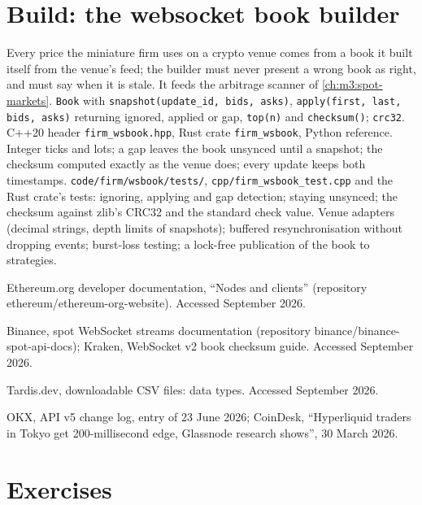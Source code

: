 \section{Build: the websocket book builder}\label{bld:m3:crypto-data-and-infrastructure:wsbook}

\begin{build}
 Every price the miniature firm uses on a crypto venue comes from a book it built itself from the venue's feed; the builder must never present a
wrong book as right, and must say when it is stale. It feeds the arbitrage scanner of \cref{ch:m3:spot-markets}.
 \texttt{Book} with \texttt{snapshot(update\_id, bids, asks)}, \texttt{apply(first, last, bids, asks)} returning ignored, applied or gap,
\texttt{top(n)} and \texttt{checksum()}; \texttt{crc32}. C++20 header \texttt{firm\_wsbook.hpp}, Rust crate \texttt{firm\_wsbook}, Python reference.
 Integer ticks and lots; a gap leaves the book unsynced until a snapshot; the checksum computed exactly as the venue does; every update keeps both
timestamps.
 \texttt{code/firm/wsbook/tests/}, \texttt{cpp/firm\_wsbook\_test.cpp} and the Rust crate's tests: ignoring, applying and gap
detection; staying unsynced; the checksum against zlib's CRC32 and the standard check value.
 Venue adapters (decimal strings, depth limits of snapshots); buffered resynchronisation without dropping events; burst-loss testing; a
lock-free publication of the book to strategies.
\end{build}

\begin{omsources}
\item Ethereum.org developer documentation, ``Nodes and clients'' (repository ethereum/ethereum-org-website). Accessed September 2026.
\item Binance, spot WebSocket streams documentation (repository binance/binance-spot-api-docs); Kraken, WebSocket v2 book checksum guide. Accessed September 2026.
\item Tardis.dev, downloadable CSV files: data types. Accessed September 2026.
\item OKX, API v5 change log, entry of 23 June 2026; CoinDesk, ``Hyperliquid traders in Tokyo get 200-millisecond edge, Glassnode research shows'', 30 March 2026.
\end{omsources}

\section{Exercises}

